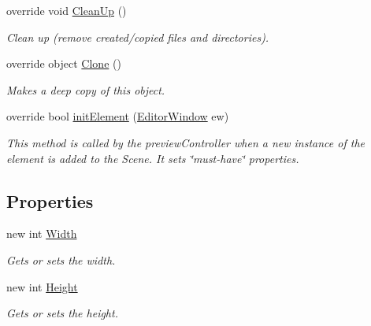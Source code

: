 \begin{DoxyCompactItemize}
override void \hyperlink{class_a_rdev_kit_1_1_model_1_1_project_1_1_image_augmentation_aecb9401ae2f65c089330e280af41d55a}{Clean\-Up} ()
\begin{DoxyCompactList}\small\item\em Clean up (remove created/copied files and directories). \end{DoxyCompactList}\item 
override object \hyperlink{class_a_rdev_kit_1_1_model_1_1_project_1_1_image_augmentation_af25172abfef48a1f9004ec3777d0d6fb}{Clone} ()
\begin{DoxyCompactList}\small\item\em Makes a deep copy of this object. \end{DoxyCompactList}\item 
override bool \hyperlink{class_a_rdev_kit_1_1_model_1_1_project_1_1_image_augmentation_a37ba80403f194a8aad7e7b96a8fd9239}{init\-Element} (\hyperlink{class_a_rdev_kit_1_1_editor_window}{Editor\-Window} ew)
\begin{DoxyCompactList}\small\item\em This method is called by the preview\-Controller when a new instance of the element is added to the Scene. It sets \char`\"{}must-\/have\char`\"{} properties. \end{DoxyCompactList}\end{DoxyCompactItemize}
\subsection*{Properties}
\begin{DoxyCompactItemize}
\item 
new int \hyperlink{class_a_rdev_kit_1_1_model_1_1_project_1_1_image_augmentation_a372f087469a33d84950310dfcd52e190}{Width}
\begin{DoxyCompactList}\small\item\em Gets or sets the width. \end{DoxyCompactList}\item 
new int \hyperlink{class_a_rdev_kit_1_1_model_1_1_project_1_1_image_augmentation_a5cecd83037a573b7f4fdfc7ebe6c7476}{Height}
\begin{DoxyCompactList}\small\item\em Gets or sets the height. \end{DoxyCompactList}\end{DoxyCompactItemize}
